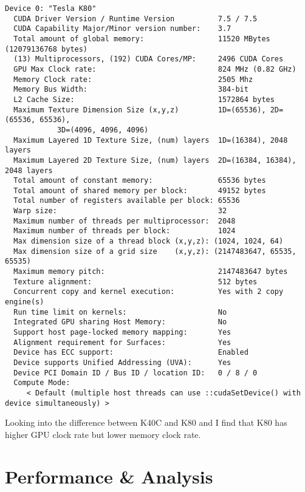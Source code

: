 \documentclass{article}
\begin{document}
\begin{verbatim}
Device 0: "Tesla K80"
  CUDA Driver Version / Runtime Version          7.5 / 7.5
  CUDA Capability Major/Minor version number:    3.7
  Total amount of global memory:                 11520 MBytes (12079136768 bytes)
  (13) Multiprocessors, (192) CUDA Cores/MP:     2496 CUDA Cores
  GPU Max Clock rate:                            824 MHz (0.82 GHz)
  Memory Clock rate:                             2505 Mhz
  Memory Bus Width:                              384-bit
  L2 Cache Size:                                 1572864 bytes
  Maximum Texture Dimension Size (x,y,z)         1D=(65536), 2D=(65536, 65536), 
  			3D=(4096, 4096, 4096)
  Maximum Layered 1D Texture Size, (num) layers  1D=(16384), 2048 layers
  Maximum Layered 2D Texture Size, (num) layers  2D=(16384, 16384), 2048 layers
  Total amount of constant memory:               65536 bytes
  Total amount of shared memory per block:       49152 bytes
  Total number of registers available per block: 65536
  Warp size:                                     32
  Maximum number of threads per multiprocessor:  2048
  Maximum number of threads per block:           1024
  Max dimension size of a thread block (x,y,z): (1024, 1024, 64)
  Max dimension size of a grid size    (x,y,z): (2147483647, 65535, 65535)
  Maximum memory pitch:                          2147483647 bytes
  Texture alignment:                             512 bytes
  Concurrent copy and kernel execution:          Yes with 2 copy engine(s)
  Run time limit on kernels:                     No
  Integrated GPU sharing Host Memory:            No
  Support host page-locked memory mapping:       Yes
  Alignment requirement for Surfaces:            Yes
  Device has ECC support:                        Enabled
  Device supports Unified Addressing (UVA):      Yes
  Device PCI Domain ID / Bus ID / location ID:   0 / 8 / 0
  Compute Mode:
     < Default (multiple host threads can use ::cudaSetDevice() with device simultaneously) >
\end{verbatim}
Looking into the difference between K40C and K80 and  I find that K80 has higher GPU clock rate but lower memory clock rate.

\section{Performance \& Analysis}
\end{document}
